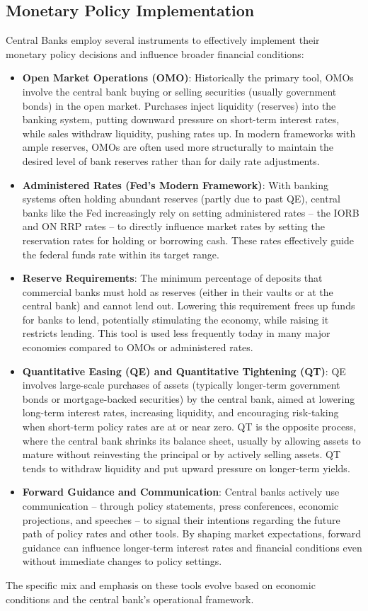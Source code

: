 \subsection{Monetary Policy Implementation}
Central Banks employ several instruments to effectively implement their monetary policy decisions and influence broader financial conditions:
\begin{itemize}
    \item \textbf{Open Market Operations (OMO)}: Historically the primary tool, OMOs involve the central bank buying or selling securities (usually government bonds) in the open market. Purchases inject liquidity (reserves) into the banking system, putting downward pressure on short-term interest rates, while sales withdraw liquidity, pushing rates up. In modern frameworks with ample reserves, OMOs are often used more structurally to maintain the desired level of bank reserves rather than for daily rate adjustments.
    \item \textbf{Administered Rates (Fed's Modern Framework)}: With banking systems often holding abundant reserves (partly due to past QE), central banks like the Fed increasingly rely on setting administered rates – the IORB and ON RRP rates – to directly influence market rates by setting the reservation rates for holding or borrowing cash. These rates effectively guide the federal funds rate within its target range.
   \item \textbf{Reserve Requirements}: The minimum percentage of deposits that commercial banks must hold as reserves (either in their vaults or at the central bank) and cannot lend out. Lowering this requirement frees up funds for banks to lend, potentially stimulating the economy, while raising it restricts lending. This tool is used less frequently today in many major economies compared to OMOs or administered rates.
   \item \textbf{Quantitative Easing (QE) and Quantitative Tightening (QT)}: QE involves large-scale purchases of assets (typically longer-term government bonds or mortgage-backed securities) by the central bank, aimed at lowering long-term interest rates, increasing liquidity, and encouraging risk-taking when short-term policy rates are at or near zero. QT is the opposite process, where the central bank shrinks its balance sheet, usually by allowing assets to mature without reinvesting the principal or by actively selling assets. QT tends to withdraw liquidity and put upward pressure on longer-term yields.
   \item \textbf{Forward Guidance and Communication}: Central banks actively use communication – through policy statements, press conferences, economic projections, and speeches – to signal their intentions regarding the future path of policy rates and other tools. By shaping market expectations, forward guidance can influence longer-term interest rates and financial conditions even without immediate changes to policy settings.
\end{itemize}
The specific mix and emphasis on these tools evolve based on economic conditions and the central bank's operational framework.

